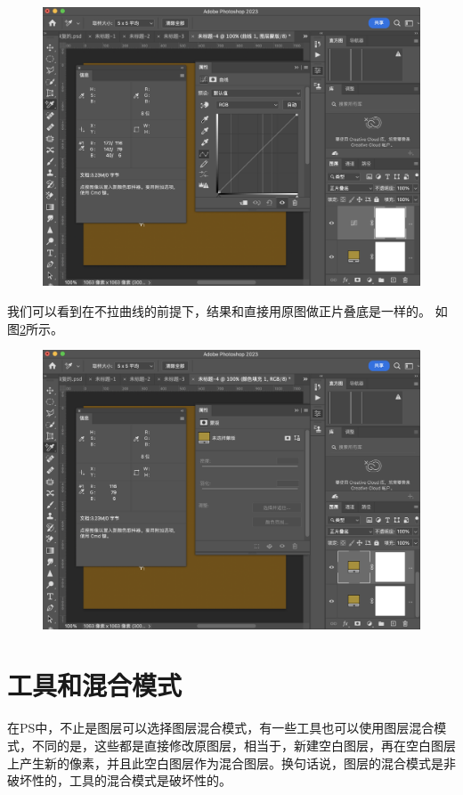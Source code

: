 \begin{figure}[h!]
	\centering
	\includegraphics[width=\linewidth]{figure/adjustandblend2}
	\caption{}
	\label{fig:adjustandblend2}
\end{figure}


\newpage 

我们可以看到在不拉曲线的前提下，结果和直接用原图做正片叠底是一样的。
如图\ref{fig:adjustandblend3}所示。
\begin{figure}[h!]
	\centering
	\includegraphics[width=\linewidth]{figure/adjustandblend3}
	\caption{}
	\label{fig:adjustandblend3}
\end{figure}

\chapter{工具和混合模式}
\begin{introduction}
	\item 在PS中，不止是图层可以选择图层混合模式，有一些工具也可以使用图层混合模式，不同的是，这些都是直接修改原图层，相当于，新建空白图层，再在空白图层上产生新的像素，并且此空白图层作为混合图层。换句话说，图层的混合模式是非破坏性的，工具的混合模式是破坏性的。
\end{introduction}
